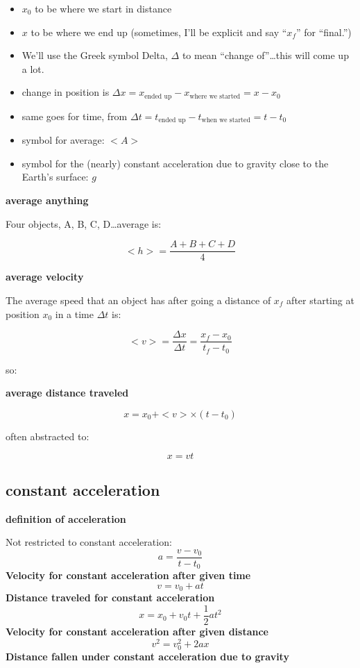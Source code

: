 \documentclass[
  letterpaper,
  DIV=11,
  numbers=noendperiod,
  oneside]{scrreprt}
\providecommand{\tightlist}{%
  \setlength{\itemsep}{0pt}\setlength{\parskip}{0pt}}\usepackage{longtable,booktabs,array}
\begin{document}
\begin{itemize}
\tightlist
\item
  \(x_0\) to be where we start in distance
\item
  \(x\) to be where we end up (sometimes, I'll be explicit and say
  ``\(x_f\)'' for ``final.'')
\item
  We'll use the Greek symbol Delta, \(\Delta\) to mean ``change
  of''\ldots this will come up a lot.
\item
  change in position is
  \(\Delta x = x_{\text{ended up}}-x_{\text{where we started}} = x-x_0\)
\item
  same goes for time, from
  \(\Delta t= t_{\text{ended up}}-t_{\text{when we started}} = t - t_0\)
\item
  symbol for average: \(<A>\)
\item
  symbol for the (nearly) constant acceleration due to gravity close to
  the Earth's surface: \(g\)
\end{itemize}

\textbf{average anything}

Four objects, A, B, C, D\ldots average is:

\[
<h> = \frac{A+B+C+D}{4}
\]

\textbf{average velocity}

The average speed that an object has after going a distance of \(x_f\)
after starting at position \(x_0\) in a time \(\Delta t\) is:

\[
\begin{equation}
<v> = \frac{\Delta x}{\Delta t} = \frac{x_f-x_0}{t_f - t_0} 
\end{equation}
\]

so:

\textbf{average distance traveled}

\[
x =x_0 +<v>\times(t-t_0)
\]

often abstracted to:

\[
x=vt
\]

\subsection{constant acceleration}\label{constant-acceleration}

\textbf{definition of acceleration}

Not restricted to constant acceleration: \[
a = \frac{v-v_0}{t-t_0}
\] \textbf{Velocity for constant acceleration after given time} \[
v = v_0 +at
\] \textbf{Distance traveled for constant acceleration} \[
x = x_0 + v_0t + \dfrac{1}{2} at^2
\] \textbf{Velocity for constant acceleration after given distance} \[
v^2   = v_0^2 + 2ax
\] \textbf{Distance fallen under constant acceleration due to gravity}
\end{document}

